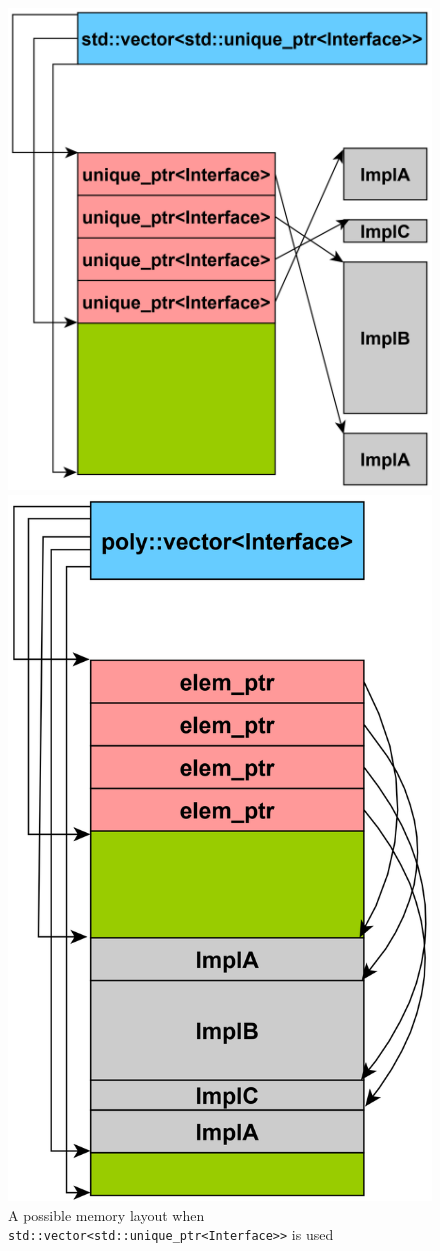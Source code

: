 \documentclass[a4paper,12pt]{article}
\begin{document}
 
\begin{figure}
\centering
\begin{minipage}{.5\textwidth}
    \centering
    \includegraphics[width=0.9\linewidth]{std_vec.png}
    \caption{A possible memory layout when \lstinline{std::vector<std::unique_ptr<Interface>>} is used}
    \label{fig:stdvecbased}
\end{minipage}%
\begin{minipage}{.5\textwidth}
    \centering
    \includegraphics[width=0.75\linewidth]{poly_vec_fig.png}

\end{minipage}
\end{figure}
\end{document}
